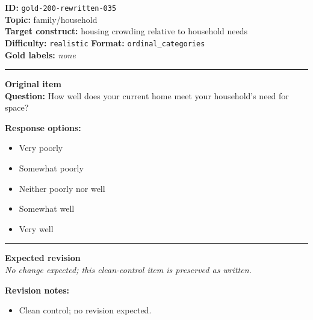 \documentclass[10pt,a4paper]{article}
\newcommand{\sectionline}{\vspace{0.15em}\hrule\vspace{0.35em}}
\begin{document}
\begin{tcolorbox}[colframe=CleanGreen,colback=white,colbacktitle=CleanGreen!9,coltitle=black,title={Item 035\hfill Clean control}]
\textbf{ID:} \texttt{gold-200-rewritten-035}\\
\textbf{Topic:} family/household\\
\textbf{Target construct:} housing crowding relative to household needs\\
\textbf{Difficulty:} \texttt{realistic} \quad \textbf{Format:} \texttt{ordinal\_categories}\\
\textbf{Gold labels:} \textit{none}\\
\sectionline
\textbf{Original item}\\
\textbf{Question:} How well does your current home meet your household's need for space?
\par\textbf{Response options:}
\begin{itemize}
\item Very poorly
\item Somewhat poorly
\item Neither poorly nor well
\item Somewhat well
\item Very well
\end{itemize}
\sectionline
\textbf{Expected revision}\\
\textit{No change expected; this clean-control item is preserved as written.}
\par\textbf{Revision notes:}
\begin{itemize}
\item Clean control; no revision expected.
\end{itemize}
\end{tcolorbox}
\end{document}
